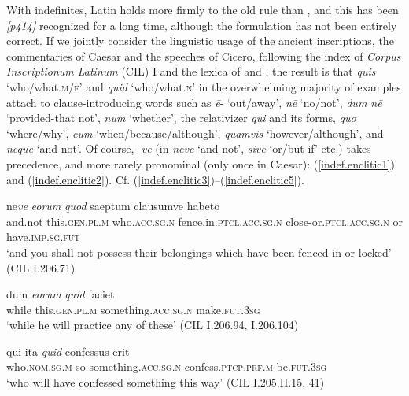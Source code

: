 With indefinites, Latin holds more firmly to the old rule than , and this has been \hyperlink{p414}{\emph{[p414]}} recognized for a long time, although the formulation has not been entirely correct. If we jointly consider the linguistic usage of the ancient inscriptions, the commentaries of Caesar and the speeches of Cicero, following the index of \emph{Corpus Inscriptionum Latinum} (CIL) I \citep{MommsenHenzen1863} and the lexica of \citet{Meusel1887} and \citet{Merguet1884}, the result is that \emph{quis} `who/what.\textsc{m/f}' and \emph{quid} `who/what.\textsc{n}' in the overwhelming majority of examples attach to clause-introducing words such as \emph{ē}- `out/away', \emph{nē} `no/not', \emph{dum nē} `provided-that not', \emph{num} `whether', the relativizer \emph{qui} and its forms, \emph{quo} `where/why', \emph{cum} `when/because/although', \emph{quamvis} `however/although', and \emph{neque} `and not'. Of course, -\emph{ve} (in \emph{neve} `and not', \emph{sive} `or/but if' etc.) takes precedence, and more rarely pronominal  (only once in Caesar): (\ref{indef.enclitic1}) and (\ref{indef.enclitic2}). Cf. (\ref{indef.enclitic3})--(\ref{indef.enclitic5}).

\begin{exe}
\ex
\gll ne\emph{ve} \emph{eorum} \emph{quod} saeptum clausumve habeto\\
and.not this.\textsc{gen.pl.m} who.\textsc{acc.sg.n} fence.in.\textsc{ptcl.acc.sg.n} close-or.\textsc{ptcl.acc.sg.n} or have.\textsc{imp.sg.fut}\\
\trans `and you shall not possess their belongings which have been fenced in or locked' (CIL I.206.71) 
\label{indef.enclitic1}
\end{exe}

\begin{exe}
\ex
\gll dum \emph{eorum} \emph{quid} faciet\\
while this.\textsc{gen.pl.m} something.\textsc{acc.sg.n} make.\textsc{fut.3sg}\\
\trans `while he will practice any of these' (CIL I.206.94, I.206.104) 
\label{indef.enclitic2}
\end{exe}

\begin{exe}
\ex
\gll qui ita \emph{quid} confessus erit\\
who.\textsc{nom.sg.m} so something.\textsc{acc.sg.n} confess.\textsc{ptcp.prf.m} be.\textsc{fut.3sg}\\
\trans `who will have confessed something this way' (CIL I.205.II.15, 41) 
\label{indef.enclitic3}
\end{exe}%

